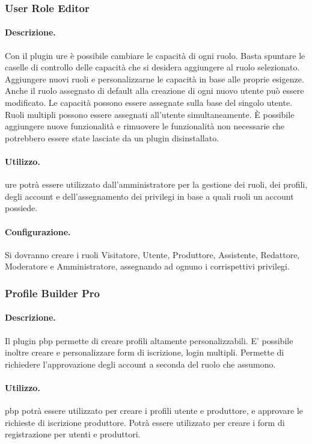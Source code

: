\subsubsection{User Role Editor} \label{plugin:ure}
\paragraph{Descrizione.} Con il plugin \gls{ure} è possibile cambiare le capacità di ogni ruolo. Basta spuntare le caselle di controllo delle capacità che si desidera aggiungere al ruolo selezionato. Aggiungere nuovi ruoli e personalizzarne le capacità in base alle proprie esigenze. Anche il ruolo assegnato di default alla creazione di ogni nuovo utente può essere modificato. Le capacità possono essere assegnate sulla base del singolo utente. Ruoli multipli possono essere assegnati all'utente simultaneamente. È possibile aggiungere nuove funzionalità e rimuovere le funzionalità non necessarie che potrebbero essere state lasciate da un plugin disinstallato.
\paragraph{Utilizzo.} \gls{ure} potrà essere utilizzato dall'amministratore per la gestione dei ruoli, dei profili, degli account e dell'assegnamento dei privilegi in base a quali ruoli un account possiede.
\paragraph{Configurazione.} Si dovranno creare i ruoli Visitatore, Utente, Produttore, Assistente, Redattore, Moderatore e Amministratore, assegnando ad ognuno i corrispettivi privilegi.

\subsubsection{Profile Builder Pro} \label{plugin:pbp}
\paragraph{Descrizione.} Il plugin \gls{pbp} permette di creare profili altamente personalizzabili. E' possibile inoltre creare e personalizzare form di iscrizione, login multipli. Permette di richiedere l'approvazione degli account a seconda del ruolo che assumono.
\paragraph{Utilizzo.}  \gls{pbp} potrà essere utilizzato per creare i profili utente e produttore, e approvare le richieste di iscrizione produttore. Potrà essere utilizzato per creare i form di registrazione per utenti e produttori.
